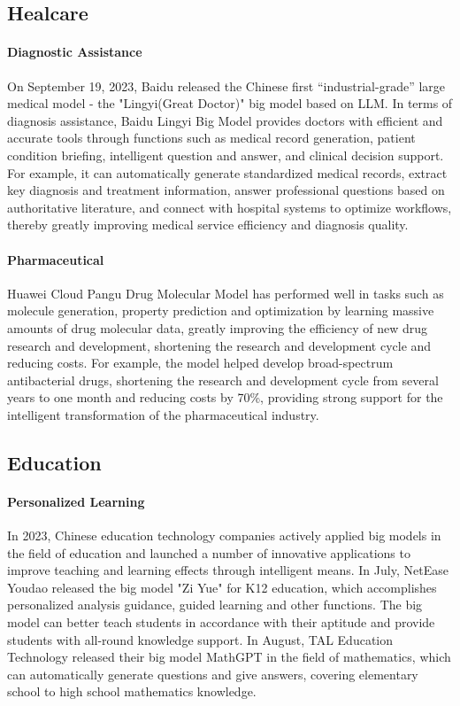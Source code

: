 \documentclass[fleqn,10pt]{SelfArx} %
\begin{document}
\subsection{Healcare}

\paragraph{Diagnostic Assistance} On September 19, 2023, Baidu released the Chinese first “industrial-grade” large medical model - the "Lingyi(Great Doctor)" big model based on LLM. In terms of diagnosis assistance, Baidu Lingyi Big Model provides doctors with efficient and accurate tools through functions such as medical record generation, patient condition briefing, intelligent question and answer, and clinical decision support. For example, it can automatically generate standardized medical records, extract key diagnosis and treatment information, answer professional questions based on authoritative literature, and connect with hospital systems to optimize workflows, thereby greatly improving medical service efficiency and diagnosis quality.

\paragraph{Pharmaceutical} Huawei Cloud Pangu Drug Molecular Model has performed well in tasks such as molecule generation, property prediction and optimization by learning massive amounts of drug molecular data, greatly improving the efficiency of new drug research and development, shortening the research and development cycle and reducing costs. For example, the model helped develop broad-spectrum antibacterial drugs, shortening the research and development cycle from several years to one month and reducing costs by 70\%, providing strong support for the intelligent transformation of the pharmaceutical industry.




\subsection{Education}

\paragraph{Personalized Learning} In 2023, Chinese education technology companies actively applied big models in the field of education and launched a number of innovative applications to improve teaching and learning effects through intelligent means. In July, NetEase Youdao released the big model "Zi Yue" for K12 education, which accomplishes personalized analysis guidance, guided learning and other functions. The big model can better teach students in accordance with their aptitude and provide students with all-round knowledge support. In August, TAL Education Technology released their big model MathGPT in the field of mathematics, which can automatically generate questions and give answers, covering elementary school to high school mathematics knowledge. 
\end{document}
